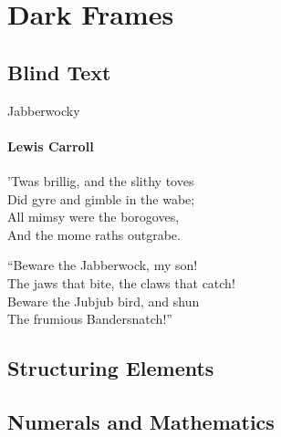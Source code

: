 \documentclass{beamer}
\begin{document}
  \section{Dark Frames}
  \begin{darkframes}
    \subsection{Blind Text}
    \begin{frame}{Jabberwocky}
      \framesubtitle{Lewis Carroll}%
      'Twas brillig, and the slithy toves\\
      Did gyre and gimble in the wabe;\\
      All mimsy were the borogoves,\\
      And the mome raths outgrabe.\\\bigskip

      “Beware the Jabberwock, my son!\\
      The jaws that bite, the claws that catch!\\
      Beware the Jubjub bird, and shun\\
      The frumious Bandersnatch!”\\
    \end{frame}
    \subsection{Structuring Elements}
    \subsection{Numerals and Mathematics}

\end{darkframes}
\end{document}
